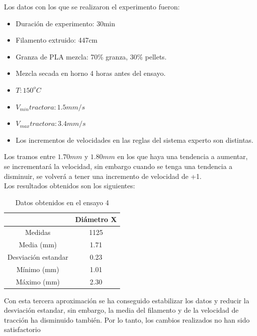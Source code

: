 Los datos con los que se realizaron el experimento fueron:

\begin{itemize}
	\item{Duración de experimento: 30min}
	\item{Filamento extruido: 447cm}
	\item{Granza de PLA mezcla: 70\% granza, 30\% pellets.}
	\item{Mezcla secada en horno 4 horas antes del ensayo.}
	\item{$T: 150^oC$}
	\item{$V_{min} tractora: 1.5 mm/s$}
	\item{$V_{max} tractora: 3.4 mm/s$}
	\item{Los incrementos de velocidades en las reglas del sistema experto son distintas.}
\end{itemize}

 Los tramos entre $1.70 mm$ y $1.80mm$ en los que haya una tendencia a aumentar, se incrementará la velocidad, sin embargo cuando se tenga una tendencia a disminuir, se volverá a tener una incremento de velocidad de +1.\\

Los resultados obtenidos son los siguientes:

\begin{table}[H]
	\centering
	\begin{tabular}{cc}
		                    & Diámetro X \\ \hline
		Medidas             & 1125      \\
		Media (mm)          & 1.71       \\
		Desviación estandar & 0.23       \\
		Mínimo (mm)         & 1.01       \\
		Máximo (mm)         & 2.30      
	\end{tabular}
	\caption{Datos obtenidos en el ensayo 4}
	\label{tab:resl_ens4}
\end{table}

Con esta tercera aproximación se ha conseguido estabilizar los datos y reducir la desviación estandar, sin embargo, la media del filamento y de la velocidad de tracción ha disminuido también. Por lo tanto, los cambios realizados no han sido satisfactorio

